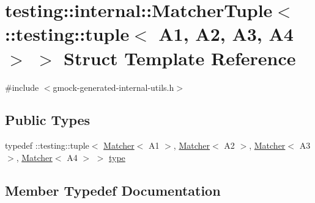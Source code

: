 \hypertarget{structtesting_1_1internal_1_1MatcherTuple_3_01_1_1testing_1_1tuple_3_01A1_00_01A2_00_01A3_00_01A4_01_4_01_4}{}\section{testing\+::internal\+::Matcher\+Tuple$<$ \+::testing\+::tuple$<$ A1, A2, A3, A4 $>$ $>$ Struct Template Reference}
\label{structtesting_1_1internal_1_1MatcherTuple_3_01_1_1testing_1_1tuple_3_01A1_00_01A2_00_01A3_00_01A4_01_4_01_4}


{\ttfamily \#include $<$gmock-\/generated-\/internal-\/utils.\+h$>$}

\subsection*{Public Types}
\begin{DoxyCompactItemize}
\item 
typedef \+::testing\+::tuple$<$ \mbox{\hyperlink{classtesting_1_1Matcher}{Matcher}}$<$ A1 $>$, \mbox{\hyperlink{classtesting_1_1Matcher}{Matcher}}$<$ A2 $>$, \mbox{\hyperlink{classtesting_1_1Matcher}{Matcher}}$<$ A3 $>$, \mbox{\hyperlink{classtesting_1_1Matcher}{Matcher}}$<$ A4 $>$ $>$ \mbox{\hyperlink{structtesting_1_1internal_1_1MatcherTuple_3_01_1_1testing_1_1tuple_3_01A1_00_01A2_00_01A3_00_01A4_01_4_01_4_afa578cadfc6b4725920b115d4f7633df}{type}}
\end{DoxyCompactItemize}


\subsection{Member Typedef Documentation}
\mbox{\label{structtesting_1_1internal_1_1MatcherTuple_3_01_1_1testing_1_1tuple_3_01A1_00_01A2_00_01A3_00_01A4_01_4_01_4_afa578cadfc6b4725920b115d4f7633df}} 
